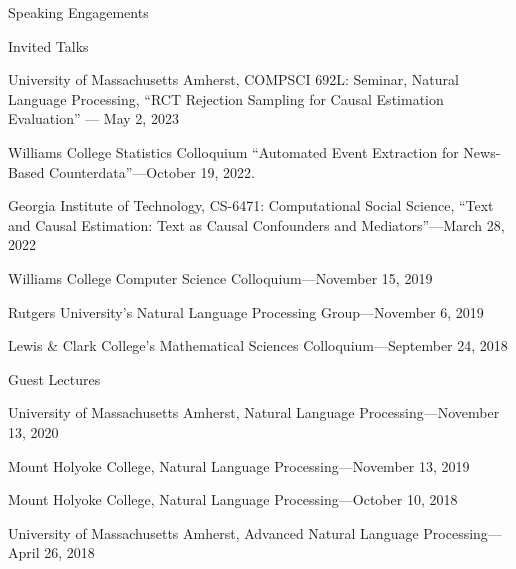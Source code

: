 \documentclass{resume} %
\begin{document}
\begin{rSection}{Speaking Engagements}

\begin{rSubsection}{Invited Talks}{}{}{}
\item University of Massachusetts Amherst, COMPSCI 692L: Seminar, Natural Language Processing, ``RCT Rejection Sampling for Causal Estimation Evaluation'' --- May 2, 2023
\item Williams College Statistics Colloquium ``Automated Event Extraction for
News-Based Counterdata''---October 19, 2022.
\item Georgia Institute of Technology, CS-6471: Computational Social Science, ``Text and Causal Estimation: Text as Causal Confounders and Mediators''---March 28, 2022
\item Williams College Computer Science Colloquium---November 15, 2019
\item Rutgers University's Natural Language Processing Group---November 6, 2019
\item Lewis \& Clark College's Mathematical Sciences Colloquium---September 24, 2018
\end{rSubsection}

\begin{rSubsection}{Guest Lectures}{}{}{}
\item University of Massachusetts Amherst, Natural Language Processing---November 13, 2020 
\item Mount Holyoke College, Natural Language Processing---November 13, 2019
\item Mount Holyoke College, Natural Language Processing---October 10, 2018
\item University of Massachusetts Amherst, Advanced Natural Language Processing---April 26, 2018
\end{rSubsection}

\end{rSection}


\end{document}
